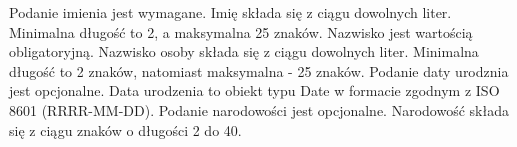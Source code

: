\begin{ograniczenia}
    \ograniczenie Podanie imienia jest wymagane.
    \ograniczenie Imię składa się z ciągu dowolnych liter. Minimalna długość to 2, a maksymalna 25 znaków.
    \ograniczenie Nazwisko jest wartością obligatoryjną.
    \ograniczenie Nazwisko osoby składa się z ciągu dowolnych liter. Minimalna długość to 2 znaków, natomiast maksymalna - 25 znaków.
    \ograniczenie Podanie daty urodznia jest opcjonalne.
    \ograniczenie Data urodzenia to obiekt typu Date w formacie zgodnym z ISO 8601 (RRRR-MM-DD).
    \ograniczenie Podanie narodowości jest opcjonalne.
    \ograniczenie Narodowość składa się z ciągu znaków o długości 2 do 40.
\end{ograniczenia}
